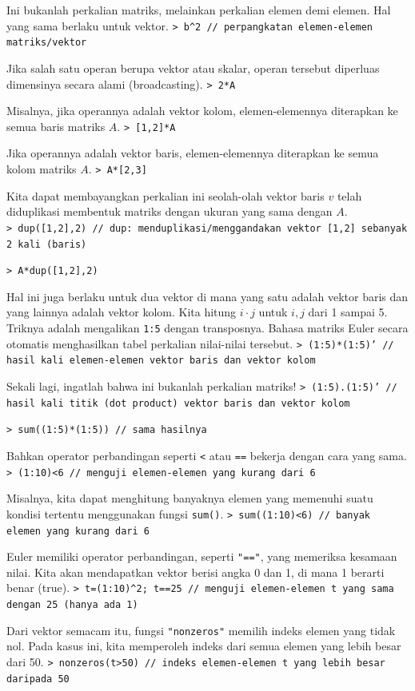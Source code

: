 \documentclass[11pt, a4paper]{article}
\newcommand{\emtcmd}[1]{\noindent\texttt{\textcolor{emtcommand}{>}\ #1}\par\smallskip}
\begin{document}
Ini bukanlah perkalian matriks, melainkan perkalian elemen demi elemen. Hal yang sama berlaku untuk vektor.
\emtcmd{b\^{}2 \textcolor{emtcomment}{// perpangkatan elemen-elemen matriks/vektor}}

Jika salah satu operan berupa vektor atau skalar, operan tersebut diperluas dimensinya secara alami (broadcasting).
\emtcmd{2*A}

Misalnya, jika operannya adalah vektor kolom, elemen-elemennya diterapkan ke semua baris matriks $A$.
\emtcmd{[1,2]*A}

Jika operannya adalah vektor baris, elemen-elemennya diterapkan ke semua kolom matriks $A$.
\emtcmd{A*[2,3]}

Kita dapat membayangkan perkalian ini seolah-olah vektor baris $v$ telah diduplikasi membentuk matriks dengan ukuran yang sama dengan $A$.
\emtcmd{dup([1,2],2) \textcolor{emtcomment}{// dup: menduplikasi/menggandakan vektor [1,2] sebanyak 2 kali (baris)}}
\emtcmd{A*dup([1,2],2)}

Hal ini juga berlaku untuk dua vektor di mana yang satu adalah vektor baris dan yang lainnya adalah vektor kolom. Kita hitung $i \cdot j$ untuk $i,j$ dari 1 sampai 5. Triknya adalah mengalikan \texttt{1:5} dengan transposnya. Bahasa matriks Euler secara otomatis menghasilkan tabel perkalian nilai-nilai tersebut.
\emtcmd{(1:5)*(1:5)' \textcolor{emtcomment}{// hasil kali elemen-elemen vektor baris dan vektor kolom}}

Sekali lagi, ingatlah bahwa ini bukanlah perkalian matriks!
\emtcmd{(1:5).(1:5)' \textcolor{emtcomment}{// hasil kali titik (dot product) vektor baris dan vektor kolom}}
\emtcmd{sum((1:5)*(1:5)) \textcolor{emtcomment}{// sama hasilnya}}

Bahkan operator perbandingan seperti \texttt{<} atau \texttt{==} bekerja dengan cara yang sama.
\emtcmd{(1:10)<6 \textcolor{emtcomment}{// menguji elemen-elemen yang kurang dari 6}}

Misalnya, kita dapat menghitung banyaknya elemen yang memenuhi suatu kondisi tertentu menggunakan fungsi \texttt{sum()}.
\emtcmd{sum((1:10)<6) \textcolor{emtcomment}{// banyak elemen yang kurang dari 6}}

Euler memiliki operator perbandingan, seperti \texttt{"=="}, yang memeriksa kesamaan nilai. Kita akan mendapatkan vektor berisi angka 0 dan 1, di mana 1 berarti benar (true).
\emtcmd{t=(1:10)\^{}2; t==25 \textcolor{emtcomment}{// menguji elemen-elemen t yang sama dengan 25 (hanya ada 1)}}

Dari vektor semacam itu, fungsi \texttt{"nonzeros"} memilih indeks elemen yang tidak nol. Pada kasus ini, kita memperoleh indeks dari semua elemen yang lebih besar dari 50.
\emtcmd{nonzeros(t>50) \textcolor{emtcomment}{// indeks elemen-elemen t yang lebih besar daripada 50}}
\end{document}
